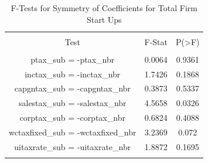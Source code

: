 \documentclass[12pt,a4paper]{article}
\begin{document}
\begin{table}[!htbp] \centering 
  \caption{F-Tests for Symmetry of Coefficients for Total Firm Start Ups} 
  \label{--Ftests} 
\begin{tabular}{@{\extracolsep{5pt}} ccc} 
\\[-1.8ex]\hline 
\hline \\[-1.8ex] 
Test & F-Stat & P(\textgreater F) \\ 
\hline \\[-1.8ex] 
ptax\_sub = -ptax\_nbr & 0.0064 & 0.9361 \\ 
inctax\_sub = -inctax\_nbr & 1.7426 & 0.1868 \\ 
capgntax\_sub = -capgntax\_nbr & 0.3873 & 0.5337 \\ 
salestax\_sub = -salestax\_nbr & 4.5658 & 0.0326 \\ 
corptax\_sub = -corptax\_nbr & 0.6824 & 0.4088 \\ 
wctaxfixed\_sub = -wctaxfixed\_nbr & 3.2369 & 0.072 \\ 
uitaxrate\_sub = -uitaxrate\_nbr & 1.8872 & 0.1695 \\ 
\hline \\[-1.8ex] 
\end{tabular} 
\end{table}
\end{document}
